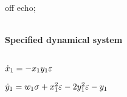 
off echo;


\(\)
\paragraph{Specified dynamical system}
\(
\)\par

\(\dot x_{1}=-x_{1} y_{1} \varepsilon
\)\par

\(\dot y_{1}=w_{1} \sigma +x_{1}^{2} \varepsilon-2 y_{1}^{2} \varepsilon-y_{1}
\)\par
